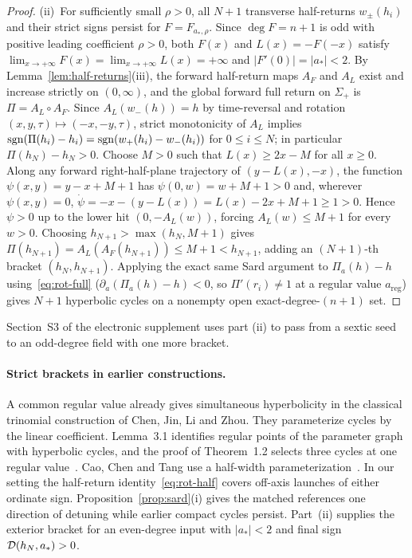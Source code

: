 \begin{proof}
(ii)~For sufficiently small $\rho>0$, all $N+1$ transverse half-returns $w_\pm(h_i)$ and their strict signs persist for $F=F_{a_*,\rho}$. Since $\deg F=n+1$ is odd with positive leading coefficient $\rho>0$, both $F(x)$ and $L(x)=-F(-x)$ satisfy $\lim_{x\to+\infty}F(x)=\lim_{x\to+\infty}L(x)=+\infty$ and $|F'(0)|=|a_*|<2$. By Lemma~\ref{lem:half-returns}(iii), the forward half-return maps $A_F$ and $A_L$ exist and increase strictly on $(0,\infty)$, and the global forward full return on $\Sigma_+$ is $\Pi=A_L\circ A_F$. Since $A_L(w_-(h))=h$ by time-reversal and rotation $(x,y,\tau)\mapsto(-x,-y,\tau)$, strict monotonicity of $A_L$ implies $\operatorname{sgn}(\Pi(h_i)-h_i)=\operatorname{sgn}(w_+(h_i)-w_-(h_i))$ for $0\le i\le N$; in particular $\Pi(h_N)-h_N>0$. Choose $M>0$ such that $L(x)\ge 2x-M$ for all $x\ge 0$. Along any forward right-half-plane trajectory of $(y-L(x),-x)$, the function $\psi(x,y)=y-x+M+1$ has $\psi(0,w)=w+M+1>0$ and, wherever $\psi(x,y)=0$, $\dot\psi=-x-(y-L(x))=L(x)-2x+M+1\ge 1>0$. Hence $\psi>0$ up to the lower hit $(0,-A_L(w))$, forcing $A_L(w)\le M+1$ for every $w>0$. Choosing $h_{N+1}>\max(h_N,M+1)$ gives $\Pi(h_{N+1})=A_L(A_F(h_{N+1}))\le M+1<h_{N+1}$, adding an $(N+1)$-th bracket $(h_N,h_{N+1})$. Applying the exact same Sard argument to $\Pi_a(h)-h$ using~\eqref{eq:rot-full} ($\partial_a(\Pi_a(h)-h)<0$, so $\Pi'(r_i)\neq 1$ at a regular value $a_{\mathrm{reg}}$) gives $N+1$ hyperbolic cycles on a nonempty open exact-degree-$(n+1)$ set.
\end{proof}
Section~S3 of the electronic supplement uses part \textup{(ii)} to
pass from a sextic seed to an odd-degree field with one more bracket.


\paragraph{Strict brackets in earlier constructions.}
A common regular value already gives simultaneous hyperbolicity in
the classical trinomial construction of Chen, Jin, Li and Zhou.
They parameterize cycles by the linear coefficient. Lemma~3.1
identifies regular points of the parameter graph with hyperbolic
cycles, and the proof of Theorem~1.2 selects three cycles at one
regular value~\cite[\S3]{CJLZ2026}. Cao, Chen and Tang use a half-width
parameterization~\cite[\S9, (82)--(84)]{CCT2026}. In our setting the
half-return identity~\eqref{eq:rot-half} covers off-axis launches of
either ordinate sign. Proposition~\ref{prop:sard}(i) gives the matched
references one direction of detuning while earlier compact cycles
persist. Part~(ii) supplies the exterior bracket for an even-degree
input with $|a_*|<2$ and final sign $\mathcal{D}(h_N,a_*)>0$.


